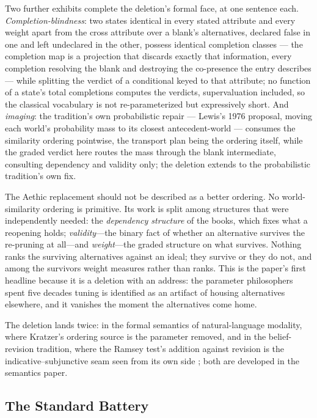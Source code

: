 \documentclass[11pt]{article}
\theoremstyle{definition}
\begin{document}
Two further exhibits complete the deletion's formal face, at one sentence each. \emph{Completion-blindness}: two states identical in every stated attribute and every weight apart from the cross attribute over a blank's alternatives, declared false in one and left undeclared in the other, possess identical completion classes --- the completion map is a projection that discards exactly that information, every completion resolving the blank and destroying the co-presence the entry describes --- while splitting the verdict of a conditional keyed to that attribute; no function of a state's total completions computes the verdicts, supervaluation included, so the classical vocabulary is not re-parameterized but expressively short. And \emph{imaging}: the tradition's own probabilistic repair --- Lewis's 1976 proposal, moving each world's probability mass to its closest antecedent-world --- consumes the similarity ordering pointwise, the transport plan being the ordering itself, while the graded verdict here routes the mass through the blank intermediate, consulting dependency and validity only; the deletion extends to the probabilistic tradition's own fix.

The Aethic replacement should not be described as a better ordering. No world-similarity ordering is primitive. Its work is split among structures that were independently needed: the \emph{dependency structure} of the books, which fixes what a reopening holds; \emph{validity}---the binary fact of whether an alternative survives the re-pruning at all---and \emph{weight}---the graded structure on what survives. Nothing ranks the surviving alternatives against an ideal; they survive or they do not, and among the survivors weight measures rather than ranks. This is the paper's first headline because it is a deletion with an address: the parameter philosophers spent five decades tuning is identified as an artifact of housing alternatives elsewhere, and it vanishes the moment the alternatives come home.

The deletion lands twice: in the formal semantics of natural-language modality, where Kratzer's ordering source is the parameter removed, and in the belief-revision tradition, where the Ramsey test's addition against revision is the indicative--subjunctive seam seen from its own side \cite{kratzer2012modals, gardenfors1988knowledge}; both are developed in the semantics paper.



\subsection{The Standard Battery}\label{sec:battery}
\end{document}
